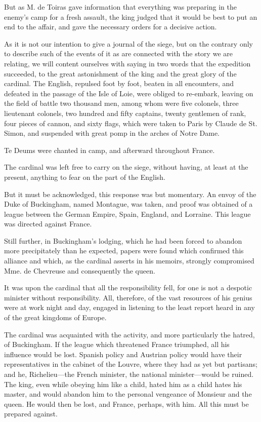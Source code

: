 But as M. de Toiras gave information that everything was preparing in the enemy's camp for a fresh assault, the king judged that it would be best to put an end to the affair, and gave the necessary orders for a decisive action. 

As it is not our intention to give a journal of the siege, but on the contrary only to describe such of the events of it as are connected with the story we are relating, we will content ourselves with saying in two words that the expedition succeeded, to the great astonishment of the king and the great glory of the cardinal. The English, repulsed foot by foot, beaten in all encounters, and defeated in the passage of the Isle of Loie, were obliged to re-embark, leaving on the field of battle two thousand men, among whom were five colonels, three lieutenant colonels, two hundred and fifty captains, twenty gentlemen of rank, four pieces of cannon, and sixty flags, which were taken to Paris by Claude de St. Simon, and suspended with great pomp in the arches of Notre Dame. 

Te Deums were chanted in camp, and afterward throughout France. 

The cardinal was left free to carry on the siege, without having, at least at the present, anything to fear on the part of the English. 

But it must be acknowledged, this response was but momentary. An envoy of the Duke of Buckingham, named Montague, was taken, and proof was obtained of a league between the German Empire, Spain, England, and Lorraine. This league was directed against France. 

Still further, in Buckingham's lodging, which he had been forced to abandon more precipitately than he expected, papers were found which confirmed this alliance and which, as the cardinal asserts in his memoirs, strongly compromised Mme. de Chevreuse and consequently the queen. 

It was upon the cardinal that all the responsibility fell, for one is not a despotic minister without responsibility. All, therefore, of the vast resources of his genius were at work night and day, engaged in listening to the least report heard in any of the great kingdoms of Europe. 

The cardinal was acquainted with the activity, and more particularly the hatred, of Buckingham. If the league which threatened France triumphed, all his influence would be lost. Spanish policy and Austrian policy would have their representatives in the cabinet of the Louvre, where they had as yet but partisans; and he, Richelieu---the French minister, the national minister---would be ruined. The king, even while obeying him like a child, hated him as a child hates his master, and would abandon him to the personal vengeance of Monsieur and the queen. He would then be lost, and France, perhaps, with him. All this must be prepared against. 

